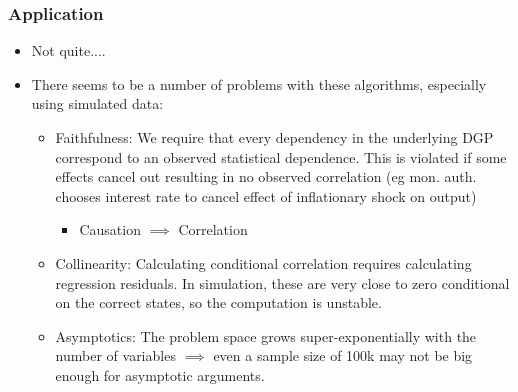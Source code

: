 \documentclass{beamer}
\begin{document}
\begin{frame}
    \frametitle{Application}
    \begin{itemize}
        \item Not quite....
        \item There seems to be a number of problems with these algorithms, especially using simulated data:
        \begin{itemize}
            \item Faithfulness: We require that every dependency in the underlying DGP correspond to an observed statistical dependence. This is violated if some effects cancel out resulting in no observed correlation (eg mon. auth. chooses interest rate to cancel effect of inflationary shock on output)
            \begin{itemize}
                \item Causation $\implies$ Correlation
            \end{itemize}
            \item Collinearity: Calculating conditional correlation requires calculating regression residuals. In simulation, these are very close to zero conditional on the correct states, so the computation is unstable.
            \item Asymptotics: The problem space grows super-exponentially with the number of variables $\implies$ even a sample size of 100k may not be big enough for asymptotic arguments.
        \end{itemize}
    \end{itemize}
\end{frame}
\end{document}
